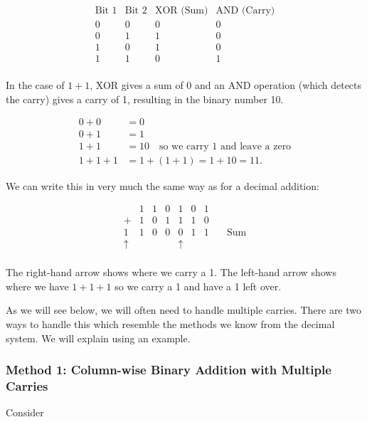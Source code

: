 \[
\begin{array}{c|c|c|c}
\text{Bit 1} & \text{Bit 2} & \text{XOR (Sum)} & \text{AND (Carry)} \\
\hline
0 & 0 & 0 & 0 \\
0 & 1 & 1 & 0 \\
1 & 0 & 1 & 0 \\
1 & 1 & 0 & 1 \\
\end{array}
\]

In the case of \(1 + 1\), XOR gives a sum of 0 and an AND operation (which detects the carry) gives a carry of 1, resulting in the binary number 10.

\begin{align*}
0 + 0 &= 0 \\
0 + 1 &= 1 \\
1 + 1 &= 10 \quad \text{so we carry 1 and leave a zero} \\
1 + 1 + 1 &= 1 + (1 + 1) = 1 + 10 = 11.
\end{align*}

We can write this in very much the same way as for a decimal addition:

\[
\begin{array}{r|r|r|r|r|r|r|r}
& 1 & 1 & 0 & 1 & 0 & 1 & \\
+ & 1 & 0 & 1 & 1 & 1 & 0 & \\
\hline
1 & 1 & 0 & 0 & 0 & 1 & 1 & \quad \text{Sum} \\
\uparrow & & & & \uparrow & & & \\
& & & & & & &
\end{array}
\]

The right-hand arrow shows where we carry a 1. The left-hand arrow shows where we have $1 + 1 + 1$ so we carry a 1 and have a 1 left over.

As we will see below, we will often need to handle multiple carries. There are two ways to handle this which resemble the methods we know from the decimal system. We will explain using an example.

\subsubsection*{Method 1: Column-wise Binary Addition with Multiple Carries}
Consider

